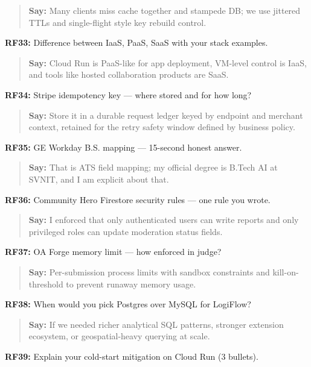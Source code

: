 \documentclass[9pt,a4paper]{article}
\begin{document}
\begin{quote}\small\textbf{Say:} Many clients miss cache together and stampede DB; we use jittered TTLs and single-flight style key rebuild control.\end{quote}
\vspace{2mm}
\textbf{RF33:} Difference between IaaS, PaaS, SaaS with your stack examples.

\begin{quote}\small\textbf{Say:} Cloud Run is PaaS-like for app deployment, VM-level control is IaaS, and tools like hosted collaboration products are SaaS.\end{quote}
\vspace{2mm}
\textbf{RF34:} Stripe idempotency key --- where stored and for how long?

\begin{quote}\small\textbf{Say:} Store it in a durable request ledger keyed by endpoint and merchant context, retained for the retry safety window defined by business policy.\end{quote}
\vspace{2mm}
\textbf{RF35:} GE Workday B.S. mapping --- 15-second honest answer.

\begin{quote}\small\textbf{Say:} That is ATS field mapping; my official degree is B.Tech AI at SVNIT, and I am explicit about that.\end{quote}
\vspace{2mm}
\textbf{RF36:} Community Hero Firestore security rules --- one rule you wrote.

\begin{quote}\small\textbf{Say:} I enforced that only authenticated users can write reports and only privileged roles can update moderation status fields.\end{quote}
\vspace{2mm}
\textbf{RF37:} OA Forge memory limit --- how enforced in judge?

\begin{quote}\small\textbf{Say:} Per-submission process limits with sandbox constraints and kill-on-threshold to prevent runaway memory usage.\end{quote}
\vspace{2mm}
\textbf{RF38:} When would you pick Postgres over MySQL for LogiFlow?

\begin{quote}\small\textbf{Say:} If we needed richer analytical SQL patterns, stronger extension ecosystem, or geospatial-heavy querying at scale.\end{quote}
\vspace{2mm}
\textbf{RF39:} Explain your cold-start mitigation on Cloud Run (3 bullets).
\end{document}
